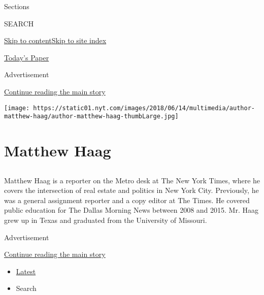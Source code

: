 Sections

SEARCH

\protect\hyperlink{site-content}{Skip to
content}\protect\hyperlink{site-index}{Skip to site index}

\href{https://myaccount.nytimes.com/auth/login?response_type=cookie\&client_id=vi}{}

\href{https://www.nytimes.com/section/todayspaper}{Today's Paper}

Advertisement

\protect\hyperlink{after-top}{Continue reading the main story}

\texttt{[image: https://static01.nyt.com/images/2018/06/14/multimedia/author-matthew-haag/author-matthew-haag-thumbLarge.jpg]}

\hypertarget{matthew-haag}{%
\section{Matthew Haag}\label{matthew-haag}}

\subsection{}

Matthew Haag is a reporter on the Metro desk at The New York Times,
where he covers the intersection of real estate and politics in New York
City. Previously, he was a general assignment reporter and a copy editor
at The Times. He covered public education for The Dallas Morning News
between 2008 and 2015. Mr. Haag grew up in Texas and graduated from the
University of Missouri.

Advertisement

\protect\hyperlink{after-mid1}{Continue reading the main story}

\begin{itemize}
\tightlist
\item
  \protect\hyperlink{stream-panel}{Latest}
\item
  Search
\end{itemize}

